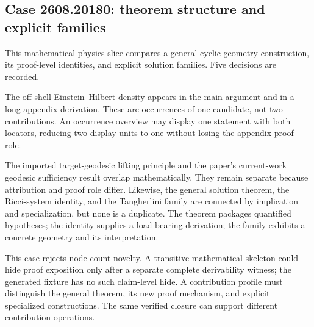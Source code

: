 \subsection{Case 2608.20180: theorem structure and explicit families}\label{case:contrib-20180}

This mathematical-physics slice compares a general cyclic-geometry construction, its proof-level identities, and explicit solution families. Five decisions are recorded.

The off-shell Einstein--Hilbert density appears in the main argument and in a long appendix derivation. These are occurrences of one candidate, not two contributions. An occurrence overview may display one statement with both locators, reducing two display units to one without losing the appendix proof role.

The imported target-geodesic lifting principle and the paper's current-work geodesic sufficiency result overlap mathematically. They remain separate because attribution and proof role differ. Likewise, the general solution theorem, the Ricci-system identity, and the Tangherlini family are connected by implication and specialization, but none is a duplicate. The theorem packages quantified hypotheses; the identity supplies a load-bearing derivation; the family exhibits a concrete geometry and its interpretation.

This case rejects node-count novelty. A transitive mathematical skeleton could hide proof exposition only after a separate complete derivability witness; the generated fixture has no such claim-level hide. A contribution profile must distinguish the general theorem, its new proof mechanism, and explicit specialized constructions. The same verified closure can support different contribution operations.